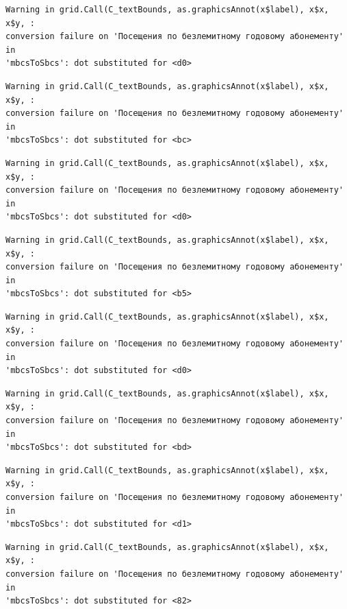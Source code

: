 \documentclass[
  letterpaper,
  DIV=11,
  numbers=noendperiod]{scrartcl}
\begin{document}
\begin{verbatim}
Warning in grid.Call(C_textBounds, as.graphicsAnnot(x$label), x$x, x$y, :
conversion failure on 'Посещения по безлемитному годовому абонементу' in
'mbcsToSbcs': dot substituted for <d0>
\end{verbatim}

\begin{verbatim}
Warning in grid.Call(C_textBounds, as.graphicsAnnot(x$label), x$x, x$y, :
conversion failure on 'Посещения по безлемитному годовому абонементу' in
'mbcsToSbcs': dot substituted for <bc>
\end{verbatim}

\begin{verbatim}
Warning in grid.Call(C_textBounds, as.graphicsAnnot(x$label), x$x, x$y, :
conversion failure on 'Посещения по безлемитному годовому абонементу' in
'mbcsToSbcs': dot substituted for <d0>
\end{verbatim}

\begin{verbatim}
Warning in grid.Call(C_textBounds, as.graphicsAnnot(x$label), x$x, x$y, :
conversion failure on 'Посещения по безлемитному годовому абонементу' in
'mbcsToSbcs': dot substituted for <b5>
\end{verbatim}

\begin{verbatim}
Warning in grid.Call(C_textBounds, as.graphicsAnnot(x$label), x$x, x$y, :
conversion failure on 'Посещения по безлемитному годовому абонементу' in
'mbcsToSbcs': dot substituted for <d0>
\end{verbatim}

\begin{verbatim}
Warning in grid.Call(C_textBounds, as.graphicsAnnot(x$label), x$x, x$y, :
conversion failure on 'Посещения по безлемитному годовому абонементу' in
'mbcsToSbcs': dot substituted for <bd>
\end{verbatim}

\begin{verbatim}
Warning in grid.Call(C_textBounds, as.graphicsAnnot(x$label), x$x, x$y, :
conversion failure on 'Посещения по безлемитному годовому абонементу' in
'mbcsToSbcs': dot substituted for <d1>
\end{verbatim}

\begin{verbatim}
Warning in grid.Call(C_textBounds, as.graphicsAnnot(x$label), x$x, x$y, :
conversion failure on 'Посещения по безлемитному годовому абонементу' in
'mbcsToSbcs': dot substituted for <82>
\end{verbatim}
\end{document}
